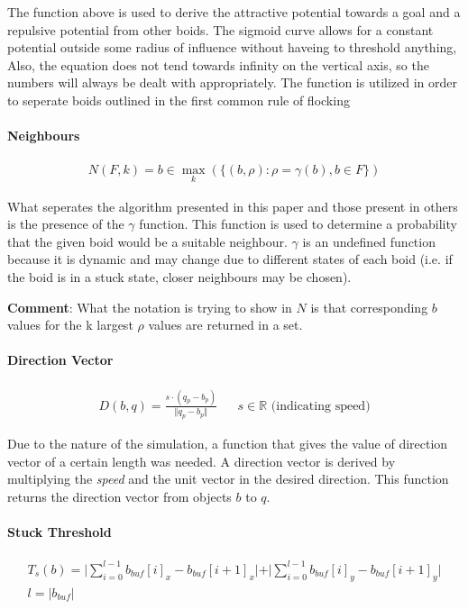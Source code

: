 \documentclass[12pt]{article}
\begin{document}
The function above is used to derive the attractive potential towards a goal and a repulsive potential from other boids. The sigmoid curve allows for a constant potential outside some radius of influence without haveing to threshold anything, Also, the equation does not tend towards infinity on the vertical axis, so the numbers will always be dealt with appropriately. The function is utilized in order to seperate boids outlined in the first common rule of flocking

\paragraph{Neighbours} 
\begin{align*}
N(F, k) = b \in \max _k (\{(b, \rho) : \rho = \gamma(b), b \in F \}) 
\end{align*}

What seperates the algorithm presented in this paper and those present in others is the presence of the \(\gamma\) function. This function is used to determine a probability that the given boid would be a suitable neighbour. \(\gamma\) is an undefined function because it is dynamic and may change due to different states of each boid (i.e. if the boid is in a stuck state, closer neighbours may be chosen). 

\textbf{Comment}: What the notation is trying to show in \(N\) is that corresponding \(b\) values for the k largest \(\rho\) values are returned in a set.

\paragraph{Direction Vector}
\begin{align*} 
D(b, q) = \frac{s \cdot (q_p - b_p)}{\Vert q_p - b_p \Vert} && s \in \mathbb{R} \text{  (indicating speed)} 
\end{align*}

Due to the nature of the simulation, a function that gives the value of direction vector of a certain length was needed. A direction vector is derived by multiplying the \textit{speed} and the unit vector in the desired direction. This function returns the direction vector from objects \(b\) to \(q\).

\paragraph{Stuck Threshold}
\begin{align*}
T_s(b) = \vert \sum_{i = 0}^{l - 1} b_{buf}[i]_x - b_{buf}[i + 1]_x \vert + \vert \sum_{i = 0}^{l - 1} b_{buf}[i]_y - b_{buf}[i + 1]_y \vert \\ l = \vert b_{buf} \vert
\end{align*}
\end{document}
